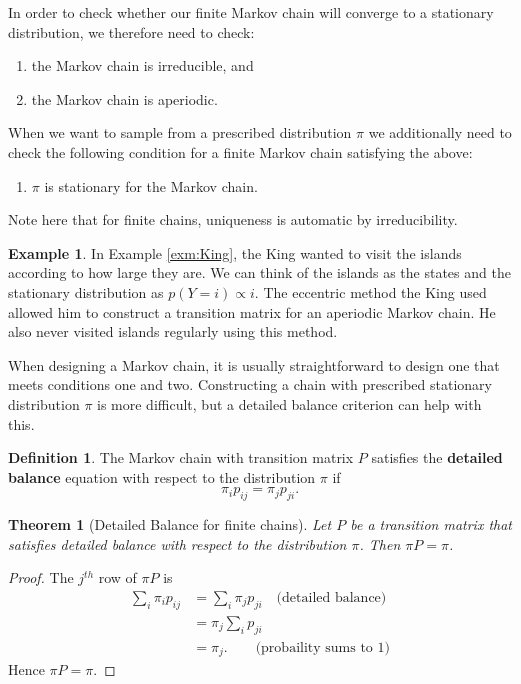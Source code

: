\documentclass[
]{book}
\newtheorem{theorem}{Theorem}[chapter]
\theoremstyle{definition}
\newtheorem{definition}{Definition}[chapter]
\theoremstyle{definition}
\newtheorem{example}{Example}[chapter]
\theoremstyle{definition}
\theoremstyle{definition}
\theoremstyle{remark}
\begin{document}
In order to check whether our finite Markov chain will converge to a stationary distribution, we therefore need to check:

\begin{enumerate}
\def\labelenumi{\arabic{enumi}.}
\item
the Markov chain is irreducible, and
\item
  the Markov chain is aperiodic.
\end{enumerate}
When we want to sample from a prescribed distribution \(\pi\) we additionally need to check the following condition for a finite Markov chain satisfying the above: 
\begin{enumerate} 
\item[3.] \(\pi\) is stationary for the Markov chain.
\end{enumerate} 
Note here that for finite chains, uniqueness is automatic by irreducibility.

\begin{example}
In Example \ref{exm:King}, the King wanted to visit the islands according to how large they are. We can think of the islands as the states and the stationary distribution as \(p(Y = i) \propto i\). The eccentric method the King used allowed him to construct a transition matrix for an aperiodic Markov chain. He also never visited islands regularly using this method.
\end{example}

When designing a Markov chain, it is usually straightforward to design one that meets conditions one and two. Constructing a chain with prescribed stationary distribution \(\pi\) is more difficult, but a detailed balance criterion can help with this.

\begin{definition}
The Markov chain with transition matrix \(P\) satisfies the \textbf{detailed balance} equation with respect to the distribution \(\pi\) if
\[
\pi_i p_{ij} = \pi_j p_{ji}. 
\]
\end{definition}

\begin{theorem}[Detailed Balance for finite chains]
Let \(P\) be a transition matrix that satisfies detailed balance with respect to the distribution \(\pi\). Then \(\pi P = \pi\).
\end{theorem}

\begin{proof}
The \(j^{th}\) row of \(\pi P\) is
\begin{align*}
\sum_{i} \pi_i p_{ij} & = \sum_{i} \pi_j p_{ji} \quad \textrm{(detailed balance)} \\
 & = \pi_j \sum_{i} p_{ji} \\
 & = \pi_j.\qquad \textrm{(probaility sums to 1)}
\end{align*}
Hence \(\pi P = \pi\).
\end{proof}
\end{document}
